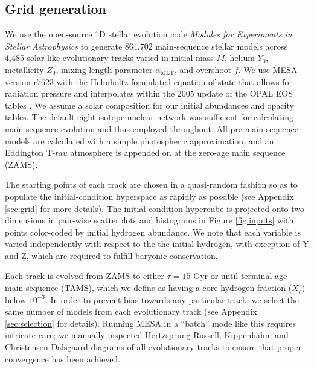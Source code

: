 \documentclass[manuscript]{aastex}
\begin{document}
\subsection{Grid generation}
\label{sec:models}
We use the open-source 1D stellar evolution code \emph{Modules for Experiments in Stellar Astrophysics} \citep[MESA,][]{2015ApJS..220...15P} to generate 864,702 main-sequence stellar models across 4,485 solar-like evolutionary tracks varied in initial mass $M$, helium $Y_0$, metallicity $Z_0$, mixing length parameter $\alpha_{\text{MLT}}$, and overshoot $f$. We use MESA version r7623 with the Helmholtz formulated equation of state that allows for radiation pressure and interpolates within the 2005 update of the OPAL EOS tables \citep{2002ApJ...576.1064R}. We assume a \citet{1998SSRv...85..161G} solar composition for our initial abundances and opacity tables. The default eight isotope nuclear-network was sufficient for calculating main sequence evolution and thus employed throughout. All pre-main-sequence models are calculated with a simple photospheric approximation, and an Eddington T-$tau$ atmosphere is appended on at the zero-age main sequence (ZAMS). 

The starting points of each track are chosen in a quasi-random fashion so as to populate the initial-condition hyperspace as rapidly as possible (see Appendix \ref{sec:grid} for more details). The initial condition hypercube is projected onto two dimensions in pair-wise scatterplots and histograms in Figure \ref{fig:inputs} with points color-coded by initial hydrogen abundance. We note that each variable is varied independently with respect to the the initial hydrogen, with exception of Y and Z, which are required to fulfill baryonic conservation. 

Each track is evolved from ZAMS to either $\tau=15$ Gyr or until terminal age main-sequence (TAMS), which we define as having a core hydrogen fraction ($X_c$) below $10^{-3}$. In order to prevent bias towards any particular track, we select the same number of models from each evolutionary track (see Appendix \ref{sec:selection} for details). Running MESA in a ``batch'' mode like this requires intricate care; we manually inspected Hertzsprung-Russell, Kippenhahn, and Christensen-Dalsgaard diagrams of all evolutionary tracks to ensure that proper convergence has been achieved. %
\end{document}
